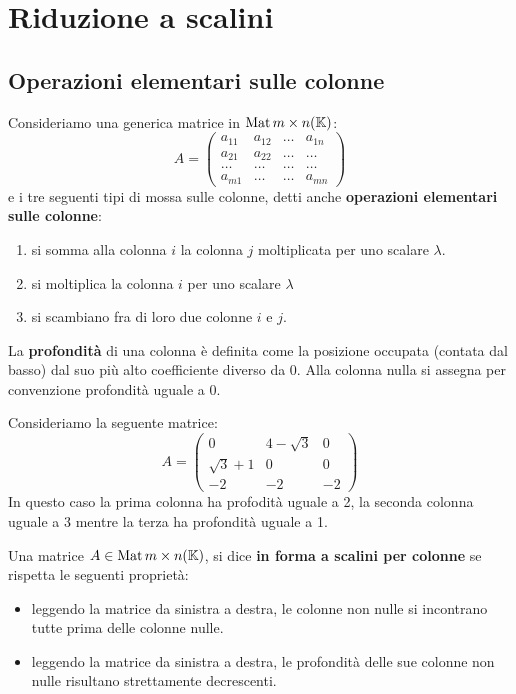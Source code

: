 \chapter{Riduzione a scalini}
\section{Operazioni elementari sulle colonne}
Consideriamo una generica matrice in $\operatorname{Mat}{m \times n}(\mathbb{K})$:
\[
	A = \begin{pmatrix}
		a_{11} & a_{12} & \dots & a_{1n} \\
		a_{21} & a_{22} & \dots & \dots  \\
		\dots  & \dots  & \dots & \dots  \\
		a_{m1} & \dots  & \dots & a_{mn}
	\end{pmatrix}
\]
e i tre seguenti tipi di mossa sulle colonne, detti anche
\textbf{operazioni elementari sulle colonne}:
\begin{enumerate}
	\item si somma alla colonna $i$ la colonna $j$ moltiplicata per uno scalare
	      $\lambda$.
	\item si moltiplica la colonna $i$ per uno scalare $\lambda$
	\item si scambiano fra di loro due colonne $i$ e $j$.
\end{enumerate}

\begin{definition}
	La \textbf{profondità} di una colonna è definita come la posizione
	occupata (contata dal basso) dal suo più alto coefficiente diverso da 0.
	Alla colonna nulla si assegna per convenzione profondità uguale a 0.
\end{definition}

\begin{example}
	Consideriamo la seguente matrice:
	\[
		A = \begin{pmatrix}
			0            & 4 - \sqrt{3} & 0  \\
			\sqrt{3} + 1 & 0            & 0  \\
			-2           & -2           & -2
		\end{pmatrix}
	\]
	In questo caso la prima colonna ha profodità uguale a 2, la
	seconda colonna uguale a 3 mentre la terza ha profondità uguale a 1.
\end{example}

\begin{definition}
	Una matrice $A \in \operatorname{Mat}{m \times n}(\mathbb{K})$, si dice
	\textbf{in forma a scalini per colonne} se rispetta le seguenti proprietà:
	\begin{itemize}
		\item leggendo la matrice da sinistra a destra, le colonne non nulle si
		      incontrano tutte prima delle colonne nulle.
		\item leggendo la matrice da sinistra a destra, le profondità
		      delle sue colonne non nulle risultano strettamente
		      decrescenti.
	\end{itemize}
\end{definition}

